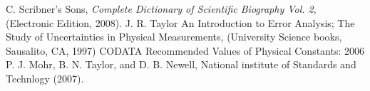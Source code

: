 \documentclass[aps,pre,twocolumn,nofootinbib]{revtex4}
\begin{document}
	\begin{thebibliography}{99}
 C. Scribner's Sons, \textit{Complete Dictionary of Scientific Biography Vol. 2},
  (Electronic Edition, 2008).
 J. R. Taylor An Introduction to Error Analysis; The Study of Uncertainties in Physical Measurements, (University Science books, Sausalito, CA, 1997)
 CODATA Recommended Values of Physical Constants: 2006 P. J. Mohr, B. N. Taylor, and D. B. Newell, National institute of Standards and Technlogy (2007).
	\end{thebibliography}
\end{document}
